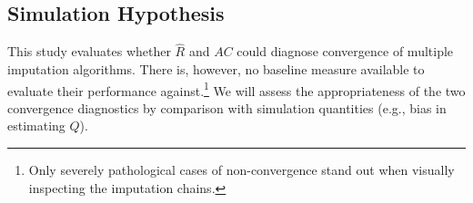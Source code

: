 \documentclass[article]{jss}
\begin{document}


\subsection{Simulation Hypothesis} \label{sec:hypothesis}

This study evaluates whether $\widehat{R}$ and $AC$ could diagnose convergence of multiple imputation algorithms. There is, however, no baseline measure available to evaluate their performance against.\footnote{Only severely pathological cases of non-convergence stand out when visually inspecting the imputation chains.} We will assess the appropriateness of the two convergence diagnostics by comparison with simulation quantities (e.g., bias in estimating $Q$).
\end{document}
